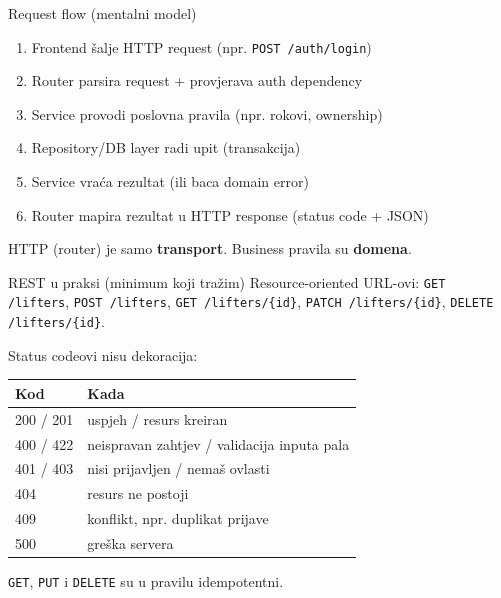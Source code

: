 \begin{frame}{Request flow (mentalni model)}
\begin{enumerate}
  \item Frontend šalje HTTP request (npr. \texttt{POST /auth/login})
  \item Router parsira request + provjerava auth dependency
  \item Service provodi poslovna pravila (npr. rokovi, ownership)
  \item Repository/DB layer radi upit (transakcija)
  \item Service vraća rezultat (ili baca domain error)
  \item Router mapira rezultat u HTTP response (status code + JSON)
\end{enumerate}

\vspace{0.6em}
HTTP (router) je samo \textbf{transport}. Business pravila su \textbf{domena}.
\end{frame}

\begin{frame}{REST u praksi (minimum koji tražim)}
Resource-oriented URL-ovi: \texttt{GET /lifters}, \texttt{POST /lifters}, \texttt{GET /lifters/\{id\}}, \texttt{PATCH /lifters/\{id\}}, \texttt{DELETE /lifters/\{id\}}.

\vspace{0.6em}
Status codeovi nisu dekoracija:

\vspace{0.4em}
\begin{tabular}{@{}lp{7.5cm}@{}}
  \toprule
  \textbf{Kod} & \textbf{Kada} \\
  \midrule
  200 / 201 & uspjeh / resurs kreiran \\
  400 / 422 & neispravan zahtjev / validacija inputa pala \\
  401 / 403 & nisi prijavljen / nemaš ovlasti \\
  404 & resurs ne postoji \\
  409 & konflikt, npr. duplikat prijave \\
  500 & greška servera \\
  \bottomrule
\end{tabular}

\vspace{0.6em}
\texttt{GET}, \texttt{PUT} i \texttt{DELETE} su u pravilu idempotentni.
\end{frame}

